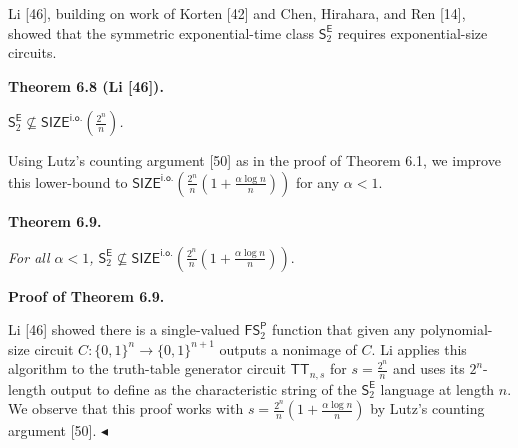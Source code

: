 \documentclass[10pt,a4paper]{article}
\begin{document}



Li [46], building on work of Korten [42] and Chen, Hirahara, and Ren [14], showed that the symmetric exponential-time class $\mathsf{S}^{\mathsf{E}}_{2}$ requires exponential-size circuits.\par





\par\medskip\noindent\textbf{
\textbf{Theorem 6.8}\textbf{ }(Li [46])\textbf{.}
}\par



$\mathsf{S}^{\mathsf{E}}_{2}\not\subseteq\mathsf{SIZE}^{\mathsf{i.o.}}\!\!\left(\frac{2^{n}}{n}\right)$\emph{.}\par






Using Lutz’s counting argument [50] as in the proof of Theorem 6.1, we improve this lower-bound to $\mathsf{SIZE}^{\mathsf{i.o.}}\!\!\left(\frac{2^{n}}{n}\!\left(1+\frac{\alpha\log n}{n}\right)\right)$ for any $\alpha<1$.\par





\par\medskip\noindent\textbf{
\textbf{Theorem 6.9}\textbf{.}
}\par



\emph{For all $\alpha<1$, $\mathsf{S}^{\mathsf{E}}_{2}\not\subseteq\mathsf{SIZE}^{\mathsf{i.o.}}\!\!\left(\frac{2^{n}}{n}\!\left(1+\frac{\alpha\log n}{n}\right)\right).$}\par







\par\medskip\noindent\textbf{Proof of Theorem 6.9.}\par




Li [46] showed there is a single-valued $\mathsf{FS}^{\mathsf{P}}_{2}$ function that given any polynomial-size circuit $C:\{0,1\}^{n}\to\{0,1\}^{n+1}$ outputs a nonimage of $C$. Li applies this algorithm to the truth-table generator circuit $\mathsf{TT}_{n,s}$ for $s=\frac{2^{n}}{n}$ and uses its $2^{n}$-length output to define as the characteristic string of the $\mathsf{S}^{\mathsf{E}}_{2}$ language at length $n$. We observe that this proof works with $s=\frac{2^{n}}{n}\!\left(1+\frac{\alpha\log n}{n}\right)$ by Lutz’s counting argument [50].
$\blacktriangleleft$\par
\end{document}
